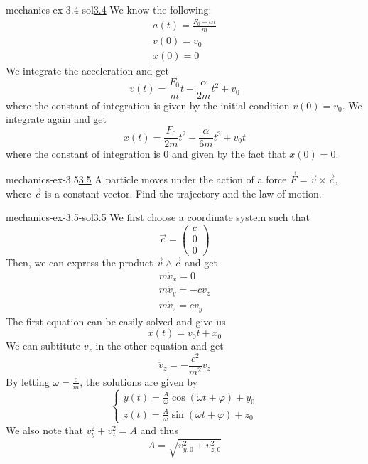 \documentclass[preview]{standalone}
\begin{document}
\begin{snippetsolution}{mechanics-ex-3.4-sol}{\underline{3.4}}
    We know the following:
    \begin{align*}
        a(t) = \frac{F_0-\alpha t}{m} \\
        v(0) = v_0 \\
        x(0) = 0
    \end{align*}
    We integrate the acceleration and get
    \[
        v(t) = \frac{F_0}{m}t - \frac{\alpha}{2m}t^2 + v_0
    \]
    where the constant of integration is given by the initial condition \(v(0) = v_0\).
    We integrate again and get
    \[
        x(t) = \frac{F_0}{2m}t^2 - \frac{\alpha}{6m}t^3 + v_0 t
    \]
    where the constant of integration is \(0\) and given by the fact that \(x(0) = 0\).
\end{snippetsolution}

\begin{snippetexercise}{mechanics-ex-3.5}{\underline{3.5}}
    A particle moves under the action of a force $\vec{F} = \vec{v} \times \vec{c}$, where $\vec{c}$ is a constant vector. Find the trajectory and the law of motion.
\end{snippetexercise}

\begin{snippetsolution}{mechanics-ex-3.5-sol}{\underline{3.5}}
    We first choose a coordinate system such that
    \[
        \vec{c} = \begin{pmatrix}
            c \\ 0 \\ 0
        \end{pmatrix}
    \]
    Then, we can express the product \(\vec{v} \wedge \vec{c}\) and get
    \begin{align*}
        m\dot{v}_x = 0 \\
        m\dot{v}_y = -cv_z \\
        m\dot{v}_z = cv_y
    \end{align*}
    The first equation can be easily solved and give us
    \[
        x(t) = v_0t + x_0
    \]
    We can subtitute \(v_z\) in the other equation and get
    \[
        \ddot{v}_z = -\frac{c^2}{m^2}v_z
    \]
    By letting \(\omega = \frac{c}{m}\), the solutions are given by
    \[
        \begin{cases}
            y(t) = \frac{A}{\omega}\cos(\omega t + \varphi) + y_0 \\
            z(t) = \frac{A}{\omega}\sin(\omega t + \varphi) + z_0
        \end{cases}
    \]
    We also note that \(v_y^2 + v_z^2 = A\) and thus
    \[
        A = \sqrt{v_{y,0}^2 + v_{z,0}^2}
    \]
\end{snippetsolution}
\end{document}
